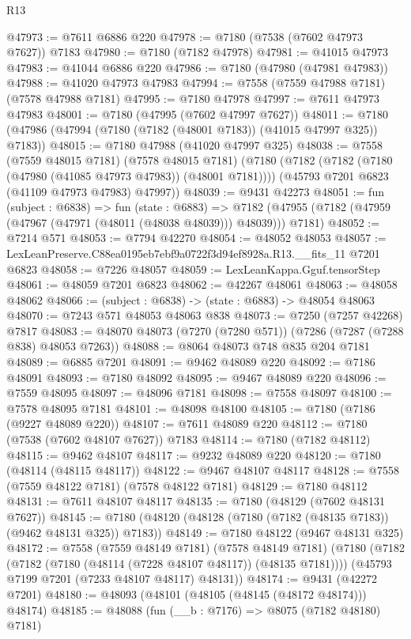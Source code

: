 \begin{lexlean}{R13}
\begin{coremodule}
@47973 := @7611 @6886 @220
@47978 := @7180 (@7538 (@7602 @47973 @7627)) @7183
@47980 := @7180 (@7182 @47978)
@47981 := @41015 @47973
@47983 := @41044 @6886 @220
@47986 := @7180 (@47980 (@47981 @47983))
@47988 := @41020 @47973 @47983
@47994 := @7558 (@7559 @47988 @7181) (@7578 @47988 @7181)
@47995 := @7180 @47978
@47997 := @7611 @47973 @47983
@48001 := @7180 (@47995 (@7602 @47997 @7627))
@48011 := @7180 (@47986 (@47994 (@7180 (@7182 (@48001 @7183)) (@41015 @47997 @325)) @7183))
@48015 := @7180 @47988 (@41020 @47997 @325)
@48038 := @7558
    (@7559 @48015 @7181)
    (@7578 @48015 @7181)
    (@7180
      (@7182 (@7182 (@7180 (@47980 (@41085 @47973 @47983)) (@48001 @7181))))
      (@45793 @7201 @6823 (@41109 @47973 @47983) @47997))
@48039 := @9431 @42273
@48051 := fun (subject : @6838) =>
  fun (state : @6883) =>
  @7182 (@47955 (@7182 (@47959 (@47967 (@47971 (@48011 (@48038 @48039))) @48039))) @7181)
@48052 := @7214 @571
@48053 := @7794 @42270
@48054 := @48052 @48053
@48057 := LexLeanPreserve.C88ea0195eb7ebf9a0722f3d94ef8928a.R13.__fits_11 @7201 @6823
@48058 := @7226 @48057
@48059 := LexLeanKappa.Gguf.tensorStep
@48061 := @48059 @7201 @6823
@48062 := @42267 @48061
@48063 := @48058 @48062
@48066 := (subject : @6838) -> (state : @6883) -> @48054 @48063
@48070 := @7243 @571 @48053 @48063 @838
@48073 := @7250 (@7257 @42268) @7817
@48083 := @48070 @48073 (@7270 (@7280 @571)) (@7286 (@7287 (@7288 @838) @48053 @7263))
@48088 := @8064 @48073 @748 @835 @204 @7181
@48089 := @6885 @7201
@48091 := @9462 @48089 @220
@48092 := @7186 @48091
@48093 := @7180 @48092
@48095 := @9467 @48089 @220
@48096 := @7559 @48095
@48097 := @48096 @7181
@48098 := @7558 @48097
@48100 := @7578 @48095 @7181
@48101 := @48098 @48100
@48105 := @7180 (@7186 (@9227 @48089 @220))
@48107 := @7611 @48089 @220
@48112 := @7180 (@7538 (@7602 @48107 @7627)) @7183
@48114 := @7180 (@7182 @48112)
@48115 := @9462 @48107
@48117 := @9232 @48089 @220
@48120 := @7180 (@48114 (@48115 @48117))
@48122 := @9467 @48107 @48117
@48128 := @7558 (@7559 @48122 @7181) (@7578 @48122 @7181)
@48129 := @7180 @48112
@48131 := @7611 @48107 @48117
@48135 := @7180 (@48129 (@7602 @48131 @7627))
@48145 := @7180 (@48120 (@48128 (@7180 (@7182 (@48135 @7183)) (@9462 @48131 @325)) @7183))
@48149 := @7180 @48122 (@9467 @48131 @325)
@48172 := @7558
    (@7559 @48149 @7181)
    (@7578 @48149 @7181)
    (@7180
      (@7182 (@7182 (@7180 (@48114 (@7228 @48107 @48117)) (@48135 @7181))))
      (@45793 @7199 @7201 (@7233 @48107 @48117) @48131))
@48174 := @9431 (@42272 @7201)
@48180 := @48093 (@48101 (@48105 (@48145 (@48172 @48174))) @48174)
@48185 := @48088 (fun (__b : @7176) => @8075 (@7182 @48180) @7181)

\end{coremodule}
\end{lexlean}
